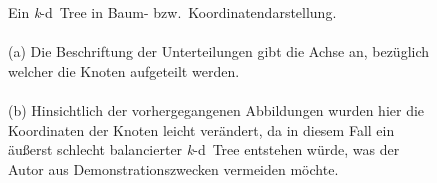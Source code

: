 \documentclass[%
			paper=a4,%
			DIV12,
			liststotoc,
			bibtotoc,
			draft=false,%
			titlepage,
			numbers=noendperiod
			]{scrartcl}
\newcommand{\kd}{\mbox{\textit{k}-d}}
\newcommand{\myfig}[5] {
 \begin{figure}[tbph]
	 \centering
	 \texttt{[image: \#1]}
	 \caption[#4]{#5}
	 \label{fig:#2}
 \end{figure}
}
\begin{document}
\begin{figure}[h]
	\centering
	\hspace{2em}

	\caption[\kd\ Tree]{Ein \kd\ Tree in Baum- bzw.\ Koordinatendarstellung.
	\\ \\
	(a) Die Beschriftung der Unterteilungen gibt die Achse an, bezüglich welcher die Knoten aufgeteilt werden.
	\\ \\
	(b) Hinsichtlich der vorhergegangenen Abbildungen wurden hier die Koordinaten der Knoten leicht verändert, da in diesem Fall ein äußerst schlecht balancierter \kd\ Tree entstehen würde, was der Autor aus Demonstrationszwecken vermeiden möchte.}
	\label{fig:kdtree}
\end{figure}

\end{document}
